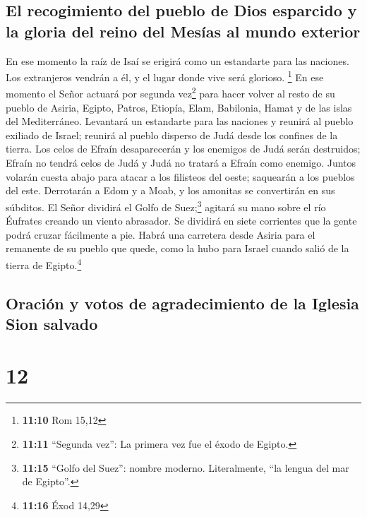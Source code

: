 \hypertarget{el-recogimiento-del-pueblo-de-dios-esparcido-y-la-gloria-del-reino-del-mesuxedas-al-mundo-exterior}{%
\subsection{El recogimiento del pueblo de Dios esparcido y la gloria del
reino del Mesías al mundo
exterior}\label{el-recogimiento-del-pueblo-de-dios-esparcido-y-la-gloria-del-reino-del-mesuxedas-al-mundo-exterior}}

 En ese momento la raíz de Isaí se erigirá como un
estandarte para las naciones. Los extranjeros vendrán a él, y el lugar
donde vive será glorioso. \footnote{\textbf{11:10} Rom 15,12}
 En ese momento el Señor actuará por segunda
vez\footnote{\textbf{11:11} ``Segunda vez'': La primera vez fue el éxodo
  de Egipto.} para hacer volver al resto de su pueblo de Asiria, Egipto,
Patros, Etiopía, Elam, Babilonia, Hamat y de las islas del Mediterráneo.
 Levantará un estandarte para las naciones y reunirá al
pueblo exiliado de Israel; reunirá al pueblo disperso de Judá desde los
confines de la tierra.  Los celos de Efraín desaparecerán
y los enemigos de Judá serán destruidos; Efraín no tendrá celos de Judá
y Judá no tratará a Efraín como enemigo.  Juntos volarán
cuesta abajo para atacar a los filisteos del oeste; saquearán a los
pueblos del este. Derrotarán a Edom y a Moab, y los amonitas se
convertirán en sus súbditos.  El Señor dividirá el Golfo
de Suez;\footnote{\textbf{11:15} ``Golfo del Suez'': nombre moderno.
  Literalmente, ``la lengua del mar de Egipto''.} agitará su mano sobre
el río Éufrates creando un viento abrasador. Se dividirá en siete
corrientes que la gente podrá cruzar fácilmente a pie. 
Habrá una carretera desde Asiria para el remanente de su pueblo que
quede, como la hubo para Israel cuando salió de la tierra de
Egipto.\footnote{\textbf{11:16} Éxod 14,29}

\hypertarget{oraciuxf3n-y-votos-de-agradecimiento-de-la-iglesia-sion-salvado}{%
\subsection{Oración y votos de agradecimiento de la Iglesia Sion
salvado}\label{oraciuxf3n-y-votos-de-agradecimiento-de-la-iglesia-sion-salvado}}

\hypertarget{section-11}{%
\section{12}\label{section-11}}

